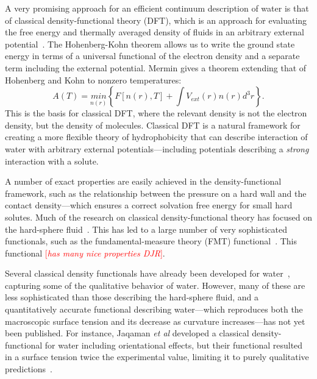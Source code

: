 \documentclass[letterpaper,twocolumn,amsmath,amssymb,prb]{revtex4-1}
\newcommand{\needsworknow}[1]{\textcolor{red}{[\emph{#1}]}}
\begin{document}
A very promising approach for an efficient continuum description of water
is that of classical density-functional theory (DFT), which is an approach
for evaluating the free energy and thermally averaged density of fluids in
an arbitrary external potential~\cite{ebner1976density}. The Hohenberg-Kohn
theorem\cite{hohenberg1964inhomogeneous} allows us to write the ground state
energy in terms of a universal functional of the electron density and a separate
term including the external potential. Mermin\cite{mermin1965thermal} gives a
theorem extending that of Hohenberg and Kohn to nonzero temperatures:
\begin{equation}
  A(T) = \underset{n(r)}{min}\left\{ F[n(r),T] + \int V_{ext}(r) n(r)
d^3r\right\}.
\end{equation}
This is the basis for classical DFT, where the relevant density is not the
electron density, but the density of molecules. Classical DFT is a
natural framework for creating a more flexible theory of hydrophobicity
that can describe interaction of water with arbitrary external
potentials---including potentials describing a \emph{strong} interaction
with a solute.
 
A number of exact properties are easily achieved in the density-functional
framework, such as the relationship between the pressure on a hard wall and
the contact density---which ensures a correct solvation free energy for
small hard solutes.  Much of the research on classical density-functional
theory has focused on the hard-sphere fluid~\cite{curtin1985,
rosenfeld1989, rosenfeld1993, rosenfeld1997, tarazona1997, tarazona2000}.
This has led to a large number of very sophisticated functionals, such as
the fundamental-measure theory (FMT) functional~\cite{rosenfeld1989,
rosenfeld1993, rosenfeld1997, tarazona1997, tarazona2000}.  This functional
\needsworknow{has many nice properties DJR}.

Several classical density functionals have already been developed for
water~\cite{ding1987, Yang1992, Jaqaman2004}, capturing some of the
qualitative behavior of water.  However, many of these are less
sophisticated than those describing the hard-sphere fluid, and a
quantitatively accurate functional describing water---which reproduces
both the macroscopic surface tension and its decrease as curvature
increases---has not yet been published.  For instance, Jaqaman
\emph{et al} developed a classical density-functional for water
including orientational effects, but their functional resulted in a
surface tension twice the experimental value, limiting it to purely
qualitative predictions~\cite{Jaqaman2004}.
\end{document}
